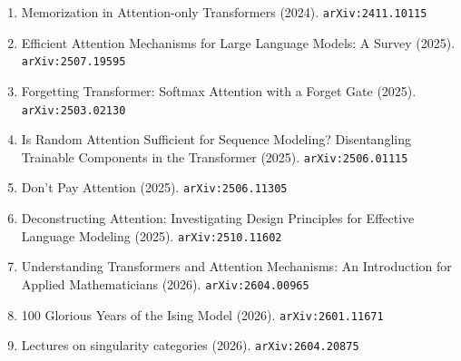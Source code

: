 \documentclass[11pt]{article}
\begin{document}
\begin{enumerate}
  \item Memorization in Attention-only Transformers (2024). \texttt{arXiv:2411.10115}
  \item Efficient Attention Mechanisms for Large Language Models: A Survey (2025). \texttt{arXiv:2507.19595}
  \item Forgetting Transformer: Softmax Attention with a Forget Gate (2025). \texttt{arXiv:2503.02130}
  \item Is Random Attention Sufficient for Sequence Modeling? Disentangling Trainable Components in the Transformer (2025). \texttt{arXiv:2506.01115}
  \item Don't Pay Attention (2025). \texttt{arXiv:2506.11305}
  \item Deconstructing Attention: Investigating Design Principles for Effective Language Modeling (2025). \texttt{arXiv:2510.11602}
  \item Understanding Transformers and Attention Mechanisms: An Introduction for Applied Mathematicians (2026). \texttt{arXiv:2604.00965}
  \item 100 Glorious Years of the Ising Model (2026). \texttt{arXiv:2601.11671}
  \item Lectures on singularity categories (2026). \texttt{arXiv:2604.20875}
\end{enumerate}
\end{document}

